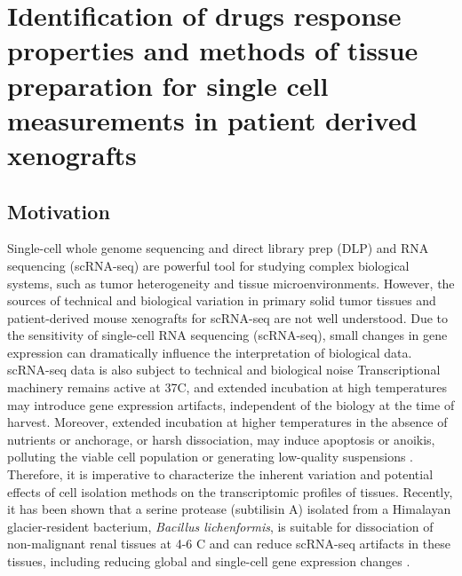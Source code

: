 \chapter{Identification of drugs response properties and methods of tissue preparation for single cell measurements in patient derived xenografts %
}
\label{ch:Chapter 3}

\section{Motivation}
Single-cell whole genome sequencing and direct library prep (DLP) and RNA sequencing (scRNA-seq) are powerful tool for studying complex biological systems, such as tumor heterogeneity and tissue microenvironments. However, the sources of technical and biological variation in primary solid tumor tissues and patient-derived mouse xenografts for scRNA-seq are not well understood.
Due to the sensitivity of single-cell RNA sequencing (scRNA-seq), small changes in gene expression can dramatically influence the interpretation of biological data. scRNA-seq data is also subject to technical and biological noise \cite{potter2018single, stegle2015computational} Transcriptional machinery remains active at 37\textdegree C, and extended incubation at high temperatures may introduce gene expression artifacts, independent of the biology at the time of harvest. Moreover, extended incubation at higher temperatures in the absence of nutrients or anchorage, or harsh dissociation, may induce apoptosis or anoikis, polluting the viable cell population or generating low-quality suspensions \cite{volovitz2016non}. Therefore, it is imperative to characterize the inherent variation and potential effects of cell isolation methods on the transcriptomic profiles of tissues. Recently, it has been shown that a serine protease (subtilisin A) isolated from a Himalayan glacier-resident bacterium, \textit{Bacillus lichenformis}, is suitable for dissociation of non-malignant renal tissues at 4-6 \textdegree C and can reduce scRNA-seq artifacts in these tissues, including reducing global and single-cell gene expression changes \cite{shah2012clonal}. 

